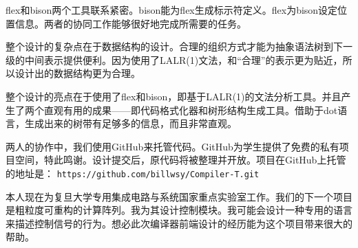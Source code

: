 flex和bison两个工具联系紧密。bison能为flex生成标示符定义。flex为bison设定位置信息。两者的协同工作能够很好地完成所需要的任务。

整个设计的复杂点在于数据结构的设计。合理的组织方式才能为抽象语法树到下一级的中间表示提供便利。因为使用了LALR(1)文法，和“合理”的表示更为贴近，所以设计出的数据结构更为合理。

整个设计的亮点在于使用了flex和bison，即基于LALR(1)的文法分析工具。并且产生了两个直观有用的成果——即代码格式化器和树形结构生成工具。借助于dot语言，生成出来的树带有足够多的信息，而且非常直观。

两人的协作中，我们使用GitHub来托管代码。GitHub为学生提供了免费的私有项目空间，特此鸣谢。设计提交后，原代码将被整理并开放。项目在GitHub上托管的地址是：
\texttt{https://github.com/billwsy/Compiler-T.git}

本人现在为复旦大学专用集成电路与系统国家重点实验室工作。我们的下一个项目是粗粒度可重构的计算阵列。我为其设计控制模块。我可能会设计一种专用的语言来描述控制信号的行为。想必此次编译器前端设计的经历能为这个项目带来很大的帮助。



